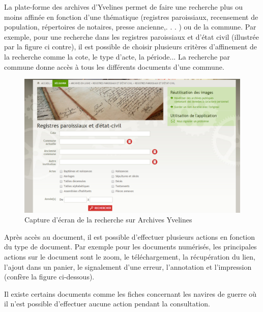         La plate-forme des archives d’Yvelines permet de faire une recherche plus ou moins affinée
        en fonction d’une thématique (registres paroissiaux, recensement de population, répertoires
        de notaires, presse ancienne,. . . ) ou de la commune. Par exemple, pour une recherche dans
        les registres paroissiaux et d’état civil (illustrée par la figure ci contre), il est possible
        de choisir plusieurs critères d’affinement de la recherche comme la cote, le type d’acte, la période...
        La recherche par commune donne accès à tous les différents documents d’une commune.

        \begin{figure}[ht!]
            \centering
            \includegraphics[width=1\textwidth]{figure/screen_yvelines_recherche.png}
            \caption{Capture d'écran de la recherche sur Archives Yvelines}
            \label{fig:yvelines_recherche}
        \end{figure}


        Après accès au document, il est possible d’effectuer plusieurs actions en fonction du type de document.
        Par exemple pour les documents numérisés, les principales actions sur le document sont le zoom,
        le téléchargement, la récupération du lien, l’ajout dans un panier, le signalement d’une erreur,
        l’annotation et l’impression (confère la figure ci-dessous).

        Il existe certains documents comme les fiches concernant les navires de guerre où il n’est possible
        d’effectuer aucune action pendant la consultation.

